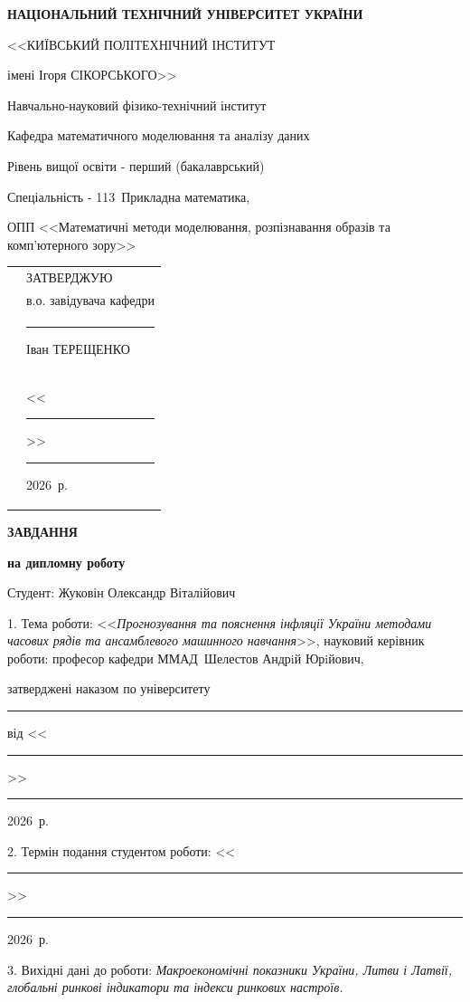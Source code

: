\documentclass{bachelor_thesis}
\newcommand{\reportAuthor}{Жуковін Олександр Віталійович}
\newcommand{\reportTitle}{Прогнозування та пояснення інфляції України методами часових рядів та ансамблевого машинного навчання}
\newcommand{\supervisorFio}{Шелестов Андрiй Юрiйович}
\newcommand{\supervisorRegalia}{професор кафедри ММАД}
\newcommand{\YearOfDefence}{2026}
\begin{document}
\begin{center}
{\bfseries
НАЦІОНАЛЬНИЙ ТЕХНІЧНИЙ УНІВЕРСИТЕТ УКРАЇНИ \par
<<КИЇВСЬКИЙ ПОЛІТЕХНІЧНИЙ ІНСТИТУТ \par
імені Ігоря СІКОРСЬКОГО>>\par
Навчально-науковий фізико-технічний інститут\par
Кафедра математичного моделювання та аналізу даних}
\end{center}
\par

Рівень вищої освіти - перший (бакалаврський)

Спеціальність - 113~Прикладна математика,

ОПП <<Математичні методи моделювання, розпізнавання образів та комп'ютерного зору>>

\vspace{10mm}
\begin{tabularx}{\textwidth}{XX}
& ЗАТВЕРДЖУЮ                                      \\[06pt]
& в.о. завідувача кафедри                               \\[06pt]
& \rule{2.5cm}{0.25pt} Іван ТЕРЕЩЕНКО             \\[06pt]
& <<\rule{0.5cm}{0.25pt}>> \rule{2.5cm}{0.25pt} \YearOfDefence~р.
\end{tabularx}

\vspace{5mm}
\begin{center}
{\bfseries ЗАВДАННЯ \par}
{\bfseries на дипломну роботу \par}
\end{center}

\frenchspacing
\doublespacing          %

Студент: \reportAuthor \par

1. Тема роботи: <<\emph{\reportTitle}>>,
науковий керівник роботи: \supervisorRegalia~\supervisorFio, \par
затверджені наказом по університету \No~\rule{0.5cm}{0.25pt} від <<\rule{0.5cm}{0.25pt}>> \rule{2.5cm}{0.25pt} \YearOfDefence~р.

2. Термін подання студентом роботи: <<\rule{0.5cm}{0.25pt}>> \rule{2.5cm}{0.25pt} \YearOfDefence~р.

3. Вихідні дані до роботи: \emph{Макроекономічні показники України, Литви і Латвії, глобальні ринкові індикатори та індекси ринкових настроїв.}
\end{document}
